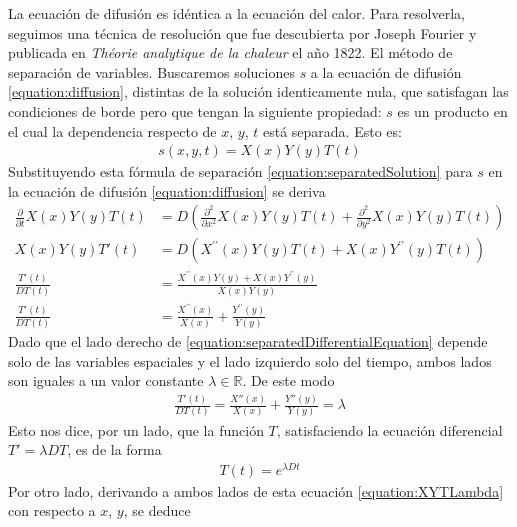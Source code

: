 \documentclass{article}
\newcommand{\realNumbers}{\mathbb{R}}
\begin{document}
  La ecuación de difusión es idéntica a la ecuación del calor.
  Para resolverla, seguimos una técnica de resolución que fue descubierta por Joseph Fourier y publicada en \emph{Théorie analytique de la chaleur} el año 1822.
  El método de separación de variables.
  Buscaremos soluciones \(s\) a la ecuación de difusión \eqref{equation:diffusion}, distintas de la solución identicamente nula, que satisfagan las condiciones de borde pero que tengan la siguiente propiedad:
  \(s\) es un producto en el cual la dependencia respecto de \(x\), \(y\), \(t\) está separada.
  Esto es:
  \begin{align}
    \label{equation:separatedSolution}
    s(x, y, t)
    =
    X(x) Y(y) T(t)
  \end{align}
  Substituyendo esta fórmula de separación \eqref{equation:separatedSolution} para \(s\) en la ecuación de difusión \eqref{equation:diffusion} se deriva
  \begin{align}
    \frac{\partial}{\partial t} X(x) Y(y) T(t)
    &=
    D \left(
      \frac{\partial^2}{\partial x^2} X(x) Y(y) T(t)
      +
      \frac{\partial^2}{\partial y^2} X(x) Y(y) T(t)
    \right)
    \\
    X(x) Y(y) T'(t)
    &=
    D \left(
      X^{\prime\prime}(x) Y(y) T(t)
      +
      X(x) Y^{\prime\prime}(y) T(t)
    \right)
    \\
    \frac{T'(t)}{D T(t)}
    &=
    \frac{X^{\prime\prime}(x) Y(y) + X(x) Y^{\prime\prime}(y)}{X(x) Y(y)}
    \\
    \label{equation:separatedDifferentialEquation}
    \frac{T'(t)}{D T(t)}
    &=
    \frac{X^{\prime\prime}(x)}{X(x)}
    +
    \frac{Y^{\prime\prime}(y)}{Y(y)}
  \end{align}
  Dado que el lado derecho de \eqref{equation:separatedDifferentialEquation} depende solo de las variables espaciales y el lado izquierdo solo del tiempo, ambos lados son iguales a un valor constante \(\lambda \in \realNumbers\).
  De este modo
  \begin{align}
    \label{equation:XYTLambda}
    \frac{T'(t)}{D T(t)}
    =
    \frac{X''(x)}{X(x)} + \frac{Y''(y)}{Y(y)}
    =
    \lambda
  \end{align}
  Esto nos dice, por un lado, que la función \(T\), satisfaciendo la ecuación diferencial \(T' = \lambda D T\), es de la forma
  \begin{align}
    T(t) = e^{\lambda D t}
  \end{align}
  Por otro lado, derivando a ambos lados de esta ecuación \eqref{equation:XYTLambda} con respecto a \(x\), \(y\), se deduce
\end{document}
